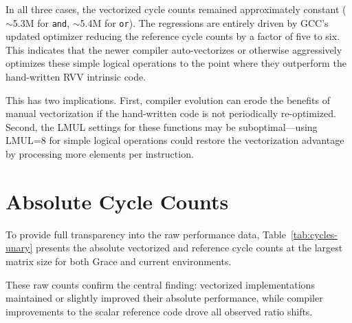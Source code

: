 In all three cases, the vectorized cycle counts remained approximately constant ($\sim$5.3M for \texttt{and}, $\sim$5.4M for \texttt{or}). The regressions are entirely driven by GCC's updated optimizer reducing the reference cycle counts by a factor of five to six. This indicates that the newer compiler auto-vectorizes or otherwise aggressively optimizes these simple logical operations to the point where they outperform the hand-written RVV intrinsic code.

This has two implications. First, compiler evolution can erode the benefits of manual vectorization if the hand-written code is not periodically re-optimized. Second, the LMUL settings for these functions may be suboptimal---using LMUL=8 for simple logical operations could restore the vectorization advantage by processing more elements per instruction.

\section{Absolute Cycle Counts}

To provide full transparency into the raw performance data, Table~\ref{tab:cycles-unary} presents the absolute vectorized and reference cycle counts at the largest matrix size for both Grace and current environments.



These raw counts confirm the central finding: vectorized implementations maintained or slightly improved their absolute performance, while compiler improvements to the scalar reference code drove all observed ratio shifts.
